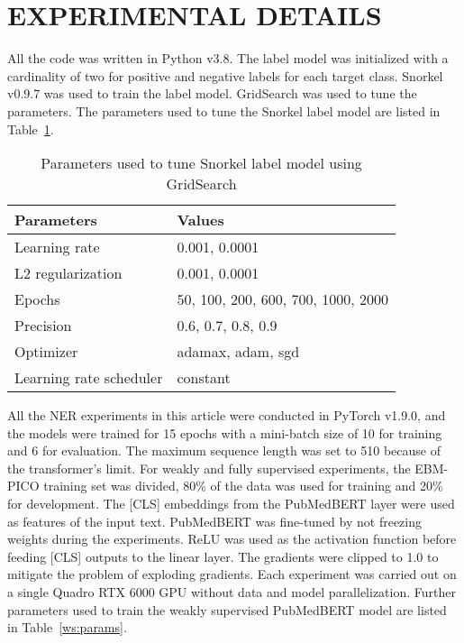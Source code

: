 \documentclass[10.7pt,]{article}
\begin{document}
\section{EXPERIMENTAL DETAILS}\label{params}
%
All the code was written in Python v3.8.
The label model was initialized with a cardinality of two for positive and negative labels for each target class. 
Snorkel v0.9.7 was used to train the label model.
GridSearch was used to tune the parameters.
The parameters used to tune the Snorkel label model are listed in Table~\ref{lm:params}.
%
\begin{table}[ht]
\centering
\begin{tabular}{|l|l|}
\hline
Parameters               & Values                              \\
\hline
Learning rate           & 0.001, 0.0001                     \\
L2 regularization       & 0.001, 0.0001                      \\
Epochs                  & 50, 100, 200, 600, 700, 1000, 2000 \\
Precision               & 0.6, 0.7, 0.8, 0.9                 \\
Optimizer               & adamax, adam, sgd                  \\
Learning rate scheduler & constant                           \\
\hline
\end{tabular}
\caption{\label{lm:params} Parameters used to tune Snorkel label model using GridSearch}
\end{table}
% 
%
%
All the NER experiments in this article were conducted in PyTorch v1.9.0, and the models were trained for 15 epochs with a mini-batch size of 10 for training and 6 for evaluation.
The maximum sequence length was set to 510 because of the transformer's limit.
For weakly and fully supervised experiments, the EBM-PICO training set was divided, 80\% of the data was used for training and 20\% for development.
The [CLS] embeddings from the PubMedBERT layer were used as features of the input text.
PubMedBERT was fine-tuned by not freezing weights during the experiments.
ReLU was used as the activation function before feeding [CLS] outputs to the linear layer.
The gradients were clipped to 1.0 to mitigate the problem of exploding gradients.
Each experiment was carried out on a single Quadro RTX 6000 GPU without data and model parallelization.
Further parameters used to train the weakly supervised PubMedBERT model are listed in Table~\ref{ws:params}.
\end{document}
